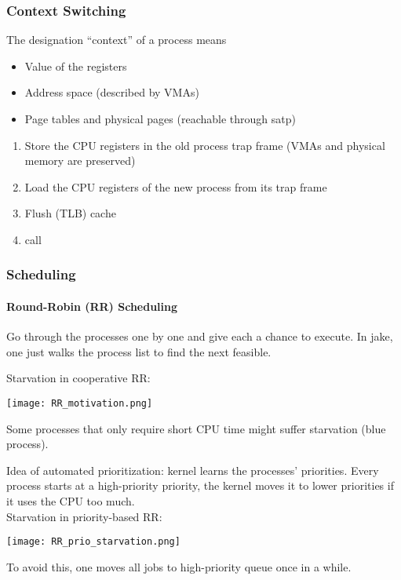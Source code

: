 \subsubsection{Context Switching}
The designation ``context'' of a process means
\begin{itemize}
    \item Value of the registers
    \item Address space (described by VMAs)
    \item Page tables and physical pages (reachable through satp)
\end{itemize}

\newpar{}

\begin{enumerate}
    \item Store the CPU registers in the old process trap frame (VMAs and physical memory are preserved)
    \item Load the CPU registers of the new process from its trap frame
    \item Flush (TLB) cache
    \item call 
\end{enumerate}

\subsubsection{Scheduling}
\paragraph{Round-Robin (RR) Scheduling}

Go through the processes one by one and give each a chance to execute. In jake, one just walks the process list to find the next feasible.

\newpar{}
Starvation in cooperative RR:
\begin{center}
    \texttt{[image: RR\_motivation.png]}
\end{center}
Some processes that only require short CPU time might suffer starvation (blue process).

\newpar{}

Idea of automated prioritization: kernel learns the processes' priorities. Every process starts at a high-priority priority, the kernel moves it to lower priorities if it uses the CPU too much.\\
Starvation in priority-based RR:
\begin{center}
    \texttt{[image: RR\_prio\_starvation.png]}
\end{center}
To avoid this, one moves all jobs to high-priority queue once in a while.

